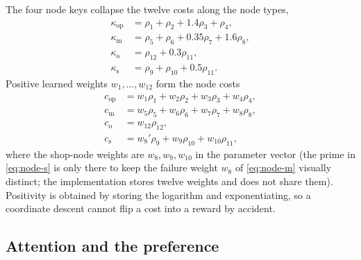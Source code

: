 The four node keys collapse the twelve costs along the node types,
\begin{align}
\kappa_{\mathrm{op}} &= \rho_1 + \rho_2 + 1.4\rho_3 + \rho_4 , \label{eq:key-op}\\
\kappa_{\mathrm{m}} &= \rho_5 + \rho_6 + 0.35\rho_7 + 1.6\rho_8 , \label{eq:key-m}\\
\kappa_{\mathrm{o}} &= \rho_{12} + 0.3\rho_{11} , \label{eq:key-o}\\
\kappa_{\mathrm{s}} &= \rho_9 + \rho_{10} + 0.5\rho_{11} . \label{eq:key-s}
\end{align}
Positive learned weights \(w_1,\ldots,w_{12}\) form the node costs
\begin{align}
c_{\mathrm{op}} &= w_1\rho_1 + w_2\rho_2 + w_3\rho_3 + w_4\rho_4 , \label{eq:node-op}\\
c_{\mathrm{m}} &= w_5\rho_5 + w_6\rho_6 + w_7\rho_7 + w_8\rho_8 , \label{eq:node-m}\\
c_{\mathrm{o}} &= w_{12}\rho_{12} , \label{eq:node-o}\\
c_{\mathrm{s}} &= w_8'\rho_9 + w_9\rho_{10} + w_{10}\rho_{11} , \label{eq:node-s}
\end{align}
where the shop-node weights are \(w_8, w_9, w_{10}\) in the parameter vector (the prime in \eqref{eq:node-s} is only there to keep the failure weight \(w_8\) of \eqref{eq:node-m} visually distinct; the implementation stores twelve weights and does not share them). Positivity is obtained by storing the logarithm and exponentiating, so a coordinate descent cannot flip a cost into a reward by accident.

\subsection{Attention and the preference}

